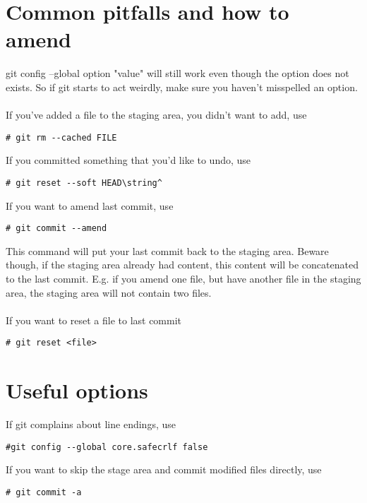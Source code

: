 \documentclass[10pt,a4paper]{article}
\begin{document}
\section{Common pitfalls and how to amend}
git config --global option "value" will still work even though the option does not exists. So if git starts to act weirdly, make sure you haven't misspelled an option.
\\\\
If you've added a file to the staging area, you didn't want to add, use
\begin{lstlisting}
# git rm --cached FILE
\end{lstlisting}
If you committed something that you'd like to undo, use
\begin{lstlisting}
# git reset --soft HEAD\string^
\end{lstlisting}
If you want to amend last commit, use
\begin{lstlisting}
# git commit --amend
\end{lstlisting}
This command will put your last commit back to the staging area. Beware though, if the staging area already had content, this content will be concatenated to the last commit. E.g. if you amend one file, but have another file in the staging area, the staging area will not contain two files.
\\\\
If you want to reset a file to last commit
\begin{lstlisting}
# git reset <file>
\end{lstlisting}

\section{Useful options}
If git complains about line endings, use
\begin{lstlisting}
#git config --global core.safecrlf false
\end{lstlisting}
If you want to skip the stage area and commit modified files directly, use
\begin{lstlisting}
# git commit -a 
\end{lstlisting}
\end{document}
